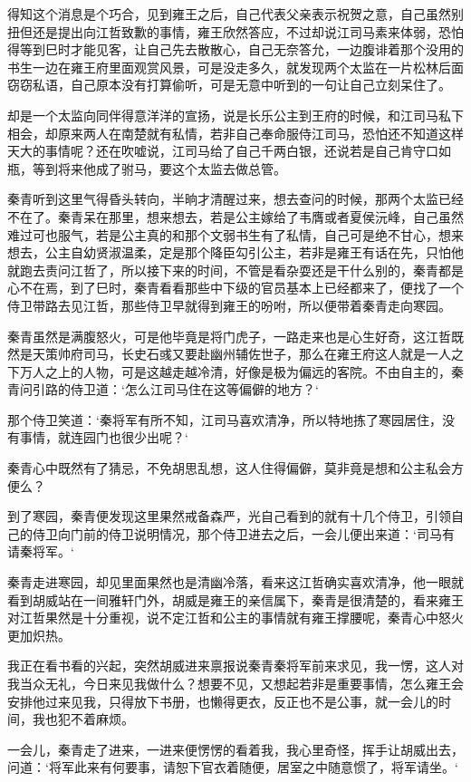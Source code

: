 得知这个消息是个巧合，见到雍王之后，自己代表父亲表示祝贺之意，自己虽然别扭但还是提出向江哲致歉的事情，雍王欣然答应，不过却说江司马素来体弱，恐怕得等到巳时才能见客，让自己先去散散心，自己无奈答允，一边腹诽着那个没用的书生一边在雍王府里面观赏风景，可是没走多久，就发现两个太监在一片松林后面窃窃私语，自己原本没有打算偷听，可是无意中听到的一句让自己立刻呆住了。

却是一个太监向同伴得意洋洋的宣扬，说是长乐公主到王府的时候，和江司马私下相会，却原来两人在南楚就有私情，若非自己奉命服侍江司马，恐怕还不知道这样天大的事情呢？还在吹嘘说，江司马给了自己千两白银，还说若是自己肯守口如瓶，等到将来他成了驸马，要这个太监去做总管。

秦青听到这里气得昏头转向，半晌才清醒过来，想去查问的时候，那两个太监已经不在了。秦青呆在那里，想来想去，若是公主嫁给了韦膺或者夏侯沅峰，自己虽然难过可也服气，若是公主真的和那个文弱书生有了私情，自己可是绝不甘心，想来想去，公主自幼贤淑温柔，定是那个降臣勾引公主，若非是雍王有话在先，只怕他就跑去责问江哲了，所以接下来的时间，不管是看杂耍还是干什么别的，秦青都是心不在焉，到了巳时，秦青看看那些中下级的官员基本上已经都来了，便找了一个侍卫带路去见江哲，那些侍卫早就得到雍王的吩咐，所以便带着秦青走向寒园。

秦青虽然是满腹怒火，可是他毕竟是将门虎子，一路走来也是心生好奇，这江哲既然是天策帅府司马，长史石彧又要赴幽州辅佐世子，那么在雍王府这人就是一人之下万人之上的人物，可是这越走越冷清，好像是极为偏远的客院。不由自主的，秦青问引路的侍卫道：‘怎么江司马住在这等偏僻的地方？‘

那个侍卫笑道：‘秦将军有所不知，江司马喜欢清净，所以特地拣了寒园居住，没有事情，就连园门也很少出呢？‘

秦青心中既然有了猜忌，不免胡思乱想，这人住得偏僻，莫非竟是想和公主私会方便么？

到了寒园，秦青便发现这里果然戒备森严，光自己看到的就有十几个侍卫，引领自己的侍卫向门前的侍卫说明情况，那个侍卫进去之后，一会儿便出来道：‘司马有请秦将军。‘

秦青走进寒园，却见里面果然也是清幽冷落，看来这江哲确实喜欢清净，他一眼就看到胡威站在一间雅轩门外，胡威是雍王的亲信属下，秦青是很清楚的，看来雍王对江哲果然是十分重视，说不定江哲和公主的事情就有雍王撑腰呢，秦青心中怒火更加炽热。

我正在看书看的兴起，突然胡威进来禀报说秦青秦将军前来求见，我一愣，这人对我当众无礼，今日来见我做什么？想要不见，又想起若非是重要事情，怎么雍王会安排他过来见我，只得放下书册，也懒得更衣，反正也不是公事，就一会儿的时间，我也犯不着麻烦。

一会儿，秦青走了进来，一进来便愣愣的看着我，我心里奇怪，挥手让胡威出去，问道：‘将军此来有何要事，请恕下官衣着随便，居室之中随意惯了，将军请坐。‘

